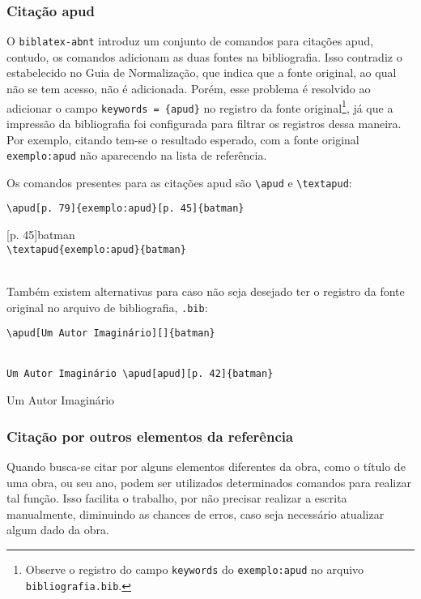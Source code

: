 \subsubsection{Citação apud}
O \texttt{biblatex-abnt} introduz um conjunto de comandos para citações apud, contudo, os comandos adicionam as duas fontes na bibliografia. Isso contradiz o estabelecido no Guia de Normalização, que indica que a fonte original, ao qual não se tem acesso, não é adicionada. Porém, esse problema é resolvido ao adicionar o campo \verb|keywords = {apud}| no registro da fonte original\footnote{Observe o registro do campo \texttt{keywords} do \texttt{exemplo:apud} no arquivo \texttt{bibliografia.bib}.}, já que a impressão da bibliografia foi configurada para filtrar os registros dessa maneira. Por exemplo, citando tem-se o resultado esperado, com a fonte original \texttt{exemplo:apud} não aparecendo na lista de referência.

Os comandos presentes para as citações apud são \verb|\apud| e \verb|\textapud|:

\verb|\apud[p. 79]{exemplo:apud}[p. 45]{batman}|

[p. 45]{batman}\\

\verb|\textapud{exemplo:apud}{batman}|

\\

Também existem alternativas para caso não seja desejado ter o registro da fonte original no arquivo de bibliografia, \texttt{.bib}:

\verb|\apud[Um Autor Imaginário][]{batman}|

\\

\verb|Um Autor Imaginário \apud[apud][p. 42]{batman}|

Um Autor Imaginário 

\subsubsection{Citação por outros elementos da referência}
Quando busca-se citar por alguns elementos diferentes da obra, como o título de uma obra, ou seu ano, podem ser utilizados determinados comandos para realizar tal função\footnotemark. Isso facilita o trabalho, por não precisar realizar a escrita manualmente, diminuindo as chances de erros, caso seja necessário atualizar algum dado da obra.

